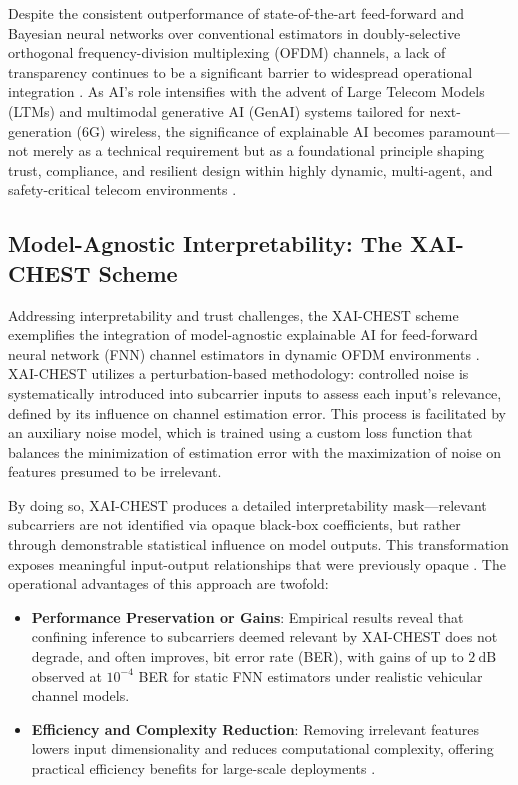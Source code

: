 \documentclass[sigconf]{acmart}
\begin{document}
Despite the consistent outperformance of state-of-the-art feed-forward and Bayesian neural networks over conventional estimators in doubly-selective orthogonal frequency-division multiplexing (OFDM) channels, a lack of transparency continues to be a significant barrier to widespread operational integration \cite{ref38}. As AI's role intensifies with the advent of Large Telecom Models (LTMs) and multimodal generative AI (GenAI) systems tailored for next-generation (6G) wireless, the significance of explainable AI becomes paramount—not merely as a technical requirement but as a foundational principle shaping trust, compliance, and resilient design within highly dynamic, multi-agent, and safety-critical telecom environments \cite{ref41}.

\subsection{Model-Agnostic Interpretability: The XAI-CHEST Scheme}

Addressing interpretability and trust challenges, the XAI-CHEST scheme exemplifies the integration of model-agnostic explainable AI for feed-forward neural network (FNN) channel estimators in dynamic OFDM environments \cite{ref38,ref41}. XAI-CHEST utilizes a perturbation-based methodology: controlled noise is systematically introduced into subcarrier inputs to assess each input’s relevance, defined by its influence on channel estimation error. This process is facilitated by an auxiliary noise model, which is trained using a custom loss function that balances the minimization of estimation error with the maximization of noise on features presumed to be irrelevant. 

By doing so, XAI-CHEST produces a detailed interpretability mask—relevant subcarriers are not identified via opaque black-box coefficients, but rather through demonstrable statistical influence on model outputs. This transformation exposes meaningful input-output relationships that were previously opaque \cite{ref41}. The operational advantages of this approach are twofold:

\begin{itemize}
    \item \textbf{Performance Preservation or Gains}: Empirical results reveal that confining inference to subcarriers deemed relevant by XAI-CHEST does not degrade, and often improves, bit error rate (BER), with gains of up to \(2~\mathrm{dB}\) observed at \(10^{-4}\) BER for static FNN estimators under realistic vehicular channel models.
    \item \textbf{Efficiency and Complexity Reduction}: Removing irrelevant features lowers input dimensionality and reduces computational complexity, offering practical efficiency benefits for large-scale deployments \cite{ref41}.
\end{itemize}
\end{document}
